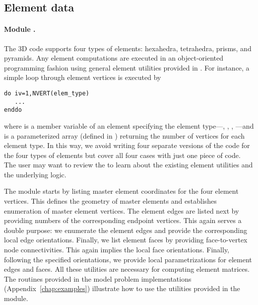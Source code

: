 \subsection{Element data}
\label{sec:element-data}

\paragraph{Module .}
The \hp3D code supports four types of elements: hexahedra, tetrahedra, prisms, and pyramids. Any element computations are executed in an object-oriented programming fashion using general element utilities provided in . For instance, a simple loop through element vertices is executed by

\begin{lstlisting}[caption=Loop over element vertices., label={lst:loop_element_vertices}]
do iv=1,NVERT(elem_type)
   ...
enddo
\end{lstlisting}

\noindent where  is a member variable of an element specifying the element type---, , , ---and  is a parameterized array (defined in  ) returning the number of vertices for each element type. In this way, we avoid writing four separate versions of the code for the four types of elements but cover all four cases with just one piece of code. The user may want to review the   to learn about the existing element utilities and the underlying logic.

The  module starts by listing master element coordinates for the four element vertices. This defines the geometry of master elements and establishes enumeration of master element vertices. The element edges are listed next by providing numbers of the corresponding endpoint vertices. This again serves a double purpose: we enumerate the element edges and provide the corresponding local edge orientations. Finally, we list element faces by providing face-to-vertex node connectivities. This again implies the local face orientations. Finally, following the specified orientations, we provide local parametrizations for element edges and faces. All these utilities are necessary for computing element matrices. The  routines provided in the model problem implementations (Appendix~\ref{chap:examples}) illustrate how to use the utilities provided in the module.

